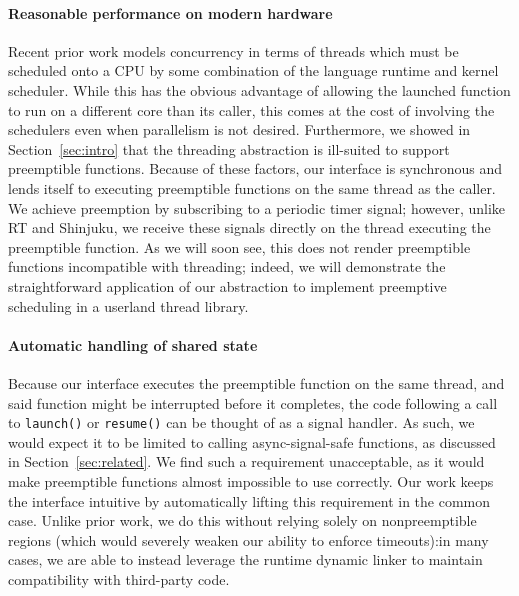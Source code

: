 \paragraph{Reasonable performance on modern hardware}
Recent prior work models concurrency in terms of threads which must be scheduled onto
a CPU by some combination of the language runtime and kernel scheduler.  While this
has the obvious advantage of allowing the launched function to run on a different
core than its caller, this comes at the cost of involving the schedulers even when
parallelism is not desired.  Furthermore, we showed in Section~\ref{sec:intro} that
the threading abstraction is ill-suited to support preemptible functions.  Because of
these factors, our interface is synchronous and lends itself to executing preemptible
functions on the same thread as the caller.  We achieve preemption by subscribing to
a periodic timer signal; however, unlike RT and Shinjuku, we receive these signals
directly on the thread executing the preemptible function.  As we will soon see, this
does not render preemptible functions incompatible with threading; indeed, we will
demonstrate the straightforward application of our abstraction to implement
preemptive scheduling in a userland thread library.

\paragraph{Automatic handling of shared state}
Because our interface executes the preemptible function on the same thread, and said
function might be interrupted before it completes, the code following a call to
\texttt{launch()} or \texttt{resume()} can be thought of as a signal handler.  As
such, we would expect it to be limited to calling async-signal-safe functions, as
discussed in Section~\ref{sec:related}.  We find such a requirement unacceptable, as
it would make preemptible functions almost impossible to use correctly.  Our work
keeps the interface intuitive by automatically lifting this requirement in the common
case.  Unlike prior work, we do this without relying solely on nonpreemptible regions
(which would severely weaken our ability to enforce timeouts):\@ in many cases, we
are able to instead leverage the runtime dynamic linker to maintain compatibility
with third-party code.

